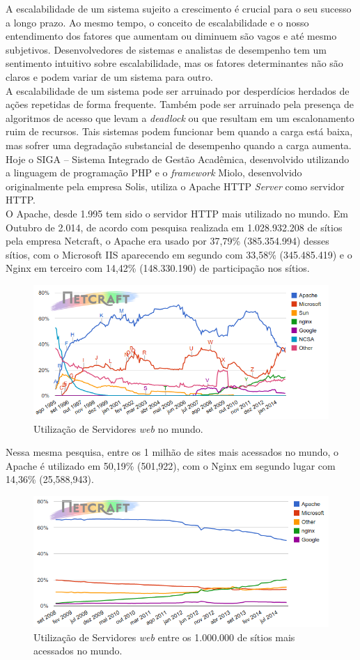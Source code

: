 A escalabilidade de um sistema sujeito a crescimento é crucial para o seu 
sucesso a longo prazo. Ao mesmo tempo, o conceito de escalabilidade e o nosso 
entendimento dos fatores que aumentam ou diminuem são vagos e até mesmo 
subjetivos. Desenvolvedores de sistemas e analistas de desempenho tem um 
sentimento intuitivo sobre escalabilidade, mas os fatores determinantes não são 
claros e podem variar de um sistema para outro.\\
A escalabilidade de um sistema pode ser arruinado por desperdícios herdados de 
ações repetidas de forma frequente. Também pode ser arruinado pela presença de 
algoritmos de acesso que levam a \textit{deadlock} ou que resultam em um 
escalonamento ruim de recursos. Tais sistemas podem funcionar bem quando a 
carga está baixa, mas sofrer uma degradação substancial de desempenho quando a 
carga aumenta.
Hoje o SIGA – Sistema Integrado de Gestão Acadêmica, desenvolvido utilizando a  
linguagem de programação PHP e o \textit{framework} Miolo, desenvolvido 
originalmente pela empresa Solis, utiliza o Apache HTTP \textit{Server} como 
servidor HTTP.\\
O Apache, desde 1.995 tem sido o servidor HTTP mais utilizado no mundo. Em 
Outubro de 2.014, de acordo com pesquisa realizada em 1.028.932.208 de sítios 
pela empresa Netcraft, o Apache era usado por 37,79\% (385.354.994) desses 
sítios, com o Microsoft IIS aparecendo em segundo com 33,58\% (345.485.419) e o 
Nginx em terceiro com 14,42\% (148.330.190) de participação nos sítios.\\
\begin{figure}[H]
	\centering
	\includegraphics[width=0.6\linewidth]{figuras/grafico1}
	\caption{Utilização de Servidores \textit{web} no mundo.}
	\label{fig:webservers-utilizacao}
\end{figure}
Nessa mesma pesquisa, entre os 1 milhão de sites mais acessados no mundo, o 
Apache é utilizado em 50,19\% (501,922), com o Nginx em segundo lugar com 
14,36\% (25,588,943).\\
\begin{figure}[H]
	\centering
	\includegraphics[width=0.6\linewidth]{figuras/grafico2} 
	\caption{Utilização de Servidores \textit{web} entre os 1.000.000 de sítios 
	mais acessados no mundo.}
	\label{fig:webservers-utilizacao-milhao}
\end{figure}
